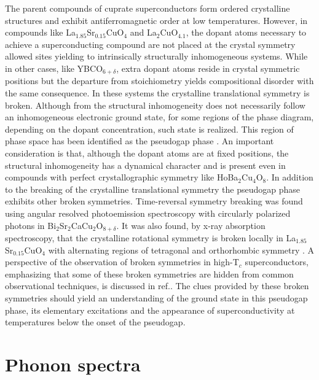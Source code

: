 The parent compounds of cuprate superconductors form ordered crystalline structures and exhibit antiferromagnetic order at low temperatures. 
However,  in compounds like La$_{1.85}$Sr$_{0.15}$CuO$_{4}$ and La$_{2}$CuO$_{4.1}$, the dopant atoms necessary to achieve a superconducting compound are not placed at the crystal symmetry allowed sites yielding to intrinsically structurally inhomogeneous systems\cite{Poccia2011}. 
While in other cases, like YBCO$_{6+\delta}$, extra dopant atoms reside in crystal symmetric positions but the departure from stoichiometry yields compositional disorder\cite{Chen1988} \cite{Andersen1990} with the same consequence. 
In these systems the crystalline translational symmetry is broken. 
Although from the structural inhomogeneity does not necessarily follow an inhomogeneous electronic ground state, for some regions of the phase diagram, depending on the dopant concentration, such state is realized. 
This region of phase space has been identified as the pseudogap phase\cite{Kresin2009} \cite{Muller2007} \cite{Timusk1999}. 
An important consideration is that, although the dopant atoms are at fixed positions, the structural inhomogeneity has a dynamical character\cite{Mihailovic2005} \cite{Bianconi1996} and is present even in compounds with perfect crystallographic symmetry like HoBa$_{2}$Cu$_{4}$O$_{8}$\cite{RubioTemprano2000}. 
In addition to the breaking of the crystalline translational symmetry the pseudogap phase exhibits other broken symmetries. 
Time-reversal symmetry breaking was found using angular resolved photoemission spectroscopy with circularly polarized photons in Bi$_{2}$Sr$_{2}$CaCu$_{2}$O$_{8+\delta}$\cite{Kaminski2002}. 
It was also found, by x-ray absorption spectroscopy, that the crystalline rotational symmetry is broken locally in La$_{1.85}$Sr$_{0.15}$CuO$_{4}$ with alternating regions of tetragonal and orthorhombic symmetry \cite{Bianconi1996}. 
A perspective of the observation of broken symmetries in high-T$_{c}$ superconductors, emphasizing that some of these broken symmetries are hidden from common observational techniques, is discussed in ref.\cite{Chakravarty2011}. The clues provided by these broken symmetries should yield an understanding of the ground state in this pseudogap phase, its elementary excitations and the appearance of superconductivity at temperatures below the onset of the pseudogap. 


\section{Phonon spectra}
\label{sec:phonon_spectra}

